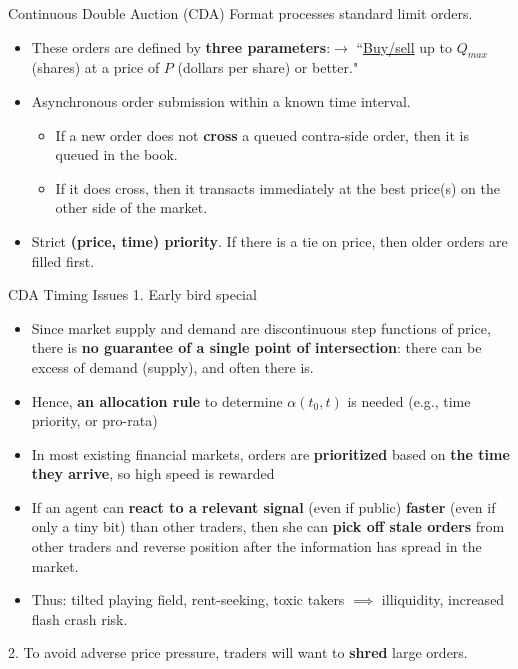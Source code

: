 \documentclass[10pt]{beamer}
\begin{document}
\begin{frame}{Continuous Double Auction (CDA) Format}
processes standard limit orders.
\begin{itemize}
    \item These orders are defined by \textbf{three parameters}:$\rightarrow$ ``\underline{Buy/sell} up to \underline{$Q_{max}$} (shares) at a price of \underline{$P$} (dollars per share) or better."
\item Asynchronous order submission within a known time interval. 
\begin{itemize}
\item If a new order does not \textbf{cross} a queued contra-side order, then it is queued in the book. 
\item If it does cross, then it transacts immediately at the best price(s) on the other side of the market.
\end{itemize}
\item Strict \textbf{(price, time) priority}. If there is a tie on price, then older orders are filled first.
    \end{itemize} 
\end{frame}



\begin{frame}{CDA Timing Issues}
1. Early bird special  
    \begin{itemize}
        \item Since market supply and demand are discontinuous step functions of price, there is \textbf{no guarantee of a single point of intersection}: there can be excess of demand (supply), and often there is. 
        \item Hence, \textbf{an allocation rule} to determine $\alpha(t_0, t)$ is needed (e.g., time priority, or pro-rata)
\item In most existing financial markets, orders are \textbf{prioritized} based on \textbf{the time they arrive}, so high speed is rewarded
\item If an agent can \textbf{react to a relevant signal} (even if public) \textbf{faster} (even if only a tiny bit) than other traders, then she can \textbf{pick off stale orders} from other traders and reverse position after the information has spread in the market.
\item  Thus: tilted playing field, rent-seeking, toxic takers $\implies$ illiquidity, increased flash crash risk.
    \end{itemize}
    2. To avoid adverse price pressure, traders will want to \textbf{shred} large orders.
    \end{frame}
\end{document}
